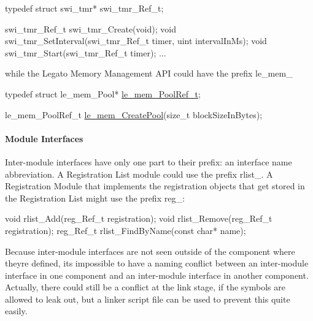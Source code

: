 \begin{DoxyCode}
\textcolor{keyword}{typedef} \textcolor{keyword}{struct }swi\_tmr* swi\_tmr\_Ref\_t;

swi\_tmr\_Ref\_t swi\_tmr\_Create(\textcolor{keywordtype}{void});
\textcolor{keywordtype}{void} swi\_tmr\_SetInterval(swi\_tmr\_Ref\_t timer, uint intervalInMs);
\textcolor{keywordtype}{void} swi\_tmr\_Start(swi\_tmr\_Ref\_t timer);
...
\end{DoxyCode}


while the Legato Memory Management A\+P\+I could have the prefix {\ttfamily le\+\_\+mem\+\_\+} 


\begin{DoxyCode}
\textcolor{keyword}{typedef} \textcolor{keyword}{struct }le\_mem\_Pool* \hyperlink{le__mem_8h_a44a896f6a0a1a8c733e8038eb332989e}{le\_mem\_PoolRef\_t};

le\_mem\_PoolRef\_t \hyperlink{le__mem_8h_ab91efaa2978c9c1c7b2427d25b33241c}{le\_mem\_CreatePool}(\textcolor{keywordtype}{size\_t} blockSizeInBytes);
\end{DoxyCode}
\hypertarget{ccoding_stds_naming_cstdsInterModuleInterfaces}{}\paragraph{Module Interfaces}\label{ccoding_stds_naming_cstdsInterModuleInterfaces}
Inter-\/module interfaces have only one part to their prefix\+: an interface name abbreviation. A Registration List module could use the prefix {\ttfamily rlist\+\_\+}. A Registration Module that implements the registration objects that get stored in the Registration List might use the prefix {\ttfamily reg\+\_\+\+:} 


\begin{DoxyCode}
\textcolor{keywordtype}{void} rlist\_Add(reg\_Ref\_t registration);
\textcolor{keywordtype}{void} rlist\_Remove(reg\_Ref\_t registration);
reg\_Ref\_t rlist\_FindByName(\textcolor{keyword}{const} \textcolor{keywordtype}{char}* name);
\end{DoxyCode}


Because inter-\/module interfaces are not seen outside of the component where they\textquotesingle{}re defined, it\textquotesingle{}s impossible to have a naming conflict between an inter-\/module interface in one component and an inter-\/module interface in another component. Actually, there could still be a conflict at the link stage, if the symbols are allowed to leak out, but a linker script file can be used to prevent this quite easily.

